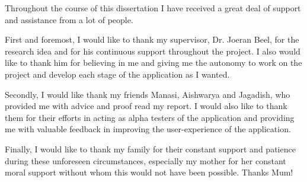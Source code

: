Throughout the course of this dissertation I have received a great deal of support and assistance from a lot of people.

First and foremost, I would like to thank my supervisor, Dr. Joeran Beel, for the research idea and for his continuous support throughout the project. I also would like to thank him for believing in me and giving me the autonomy to work on the project and develop each stage of the application as I wanted.

Secondly, I would like thank my friends Manasi, Aishwarya and Jagadish, who provided me with advice and proof read my report. I would also like to thank them for their efforts in acting as alpha testers of the application and providing me with valuable feedback in improving the user-experience of the application.

Finally, I would like to thank my family for their constant support and patience during these unforeseen circumstances, especially my mother for her constant moral support without whom this would not have been possible. Thanks Mum!